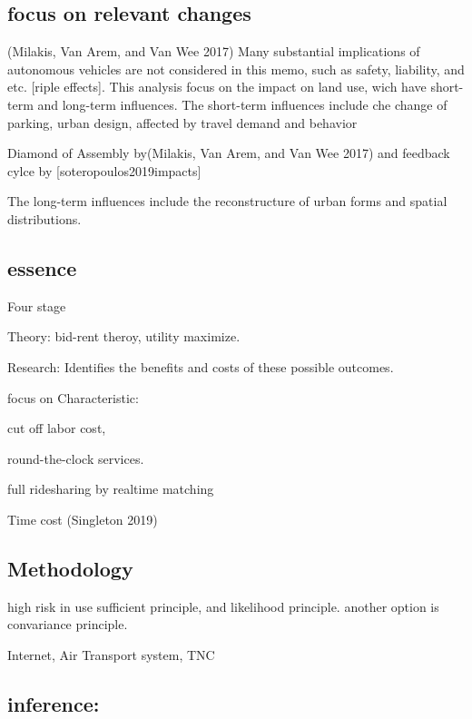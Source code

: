 \documentclass[12pt,]{article}
\begin{document}
\hypertarget{focus-on-relevant-changes}{%
\subsection{focus on relevant changes}\label{focus-on-relevant-changes}}

(Milakis, Van Arem, and Van Wee 2017) Many substantial implications of
autonomous vehicles are not considered in this memo, such as safety,
liability, and etc. {[}riple effects{]}. This analysis focus on the
impact on land use, wich have short-term and long-term influences. The
short-term influences include che change of parking, urban design,
affected by travel demand and behavior

Diamond of Assembly by(Milakis, Van Arem, and Van Wee 2017) and feedback
cylce by {[}soteropoulos2019impacts{]}

The long-term influences include the reconstructure of urban forms and
spatial distributions.

\hypertarget{essence}{%
\subsection{essence}\label{essence}}

Four stage

Theory: bid-rent theroy, utility maximize.

Research: Identifies the benefits and costs of these possible outcomes.

focus on Characteristic:

cut off labor cost,

round-the-clock services.

full ridesharing by realtime matching

Time cost (Singleton 2019)

\hypertarget{methodology}{%
\subsection{Methodology}\label{methodology}}

high risk in use sufficient principle, and likelihood principle. another
option is convariance principle.

Internet, Air Transport system, TNC

\hypertarget{inference}{%
\subsection{inference:}\label{inference}}
\end{document}
